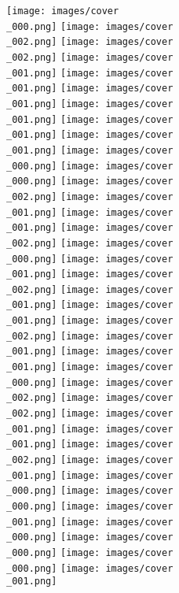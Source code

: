 \documentclass{article}%
\begin{document}
\begin{minipage}{\textwidth}
\texttt{[image: images/cover\\\_000.png]}%
\texttt{[image: images/cover\\\_002.png]}%
\texttt{[image: images/cover\\\_002.png]}%
\texttt{[image: images/cover\\\_001.png]}%
\texttt{[image: images/cover\\\_001.png]}%
\newline%
\hspace*{-1.1663792519475682cm}%
\vspace*{-0.2cm}%
\texttt{[image: images/cover\\\_001.png]}%
\texttt{[image: images/cover\\\_001.png]}%
\texttt{[image: images/cover\\\_001.png]}%
\texttt{[image: images/cover\\\_001.png]}%
\texttt{[image: images/cover\\\_000.png]}%
\texttt{[image: images/cover\\\_000.png]}%
\texttt{[image: images/cover\\\_002.png]}%
\texttt{[image: images/cover\\\_001.png]}%
\texttt{[image: images/cover\\\_001.png]}%
\newline%
\hspace*{-2.4164272347234794cm}%
\vspace*{-0.2cm}%
\texttt{[image: images/cover\\\_002.png]}%
\texttt{[image: images/cover\\\_000.png]}%
\texttt{[image: images/cover\\\_001.png]}%
\texttt{[image: images/cover\\\_002.png]}%
\texttt{[image: images/cover\\\_001.png]}%
\texttt{[image: images/cover\\\_001.png]}%
\texttt{[image: images/cover\\\_002.png]}%
\texttt{[image: images/cover\\\_001.png]}%
\texttt{[image: images/cover\\\_001.png]}%
\newline%
\hspace*{-1.224628727880675cm}%
\vspace*{-0.2cm}%
\texttt{[image: images/cover\\\_000.png]}%
\texttt{[image: images/cover\\\_002.png]}%
\texttt{[image: images/cover\\\_002.png]}%
\texttt{[image: images/cover\\\_001.png]}%
\texttt{[image: images/cover\\\_001.png]}%
\texttt{[image: images/cover\\\_002.png]}%
\texttt{[image: images/cover\\\_001.png]}%
\texttt{[image: images/cover\\\_000.png]}%
\texttt{[image: images/cover\\\_000.png]}%
\newline%
\hspace*{-1.4582735831172853cm}%
\vspace*{-0.2cm}%
\texttt{[image: images/cover\\\_001.png]}%
\texttt{[image: images/cover\\\_000.png]}%
\texttt{[image: images/cover\\\_000.png]}%
\texttt{[image: images/cover\\\_000.png]}%
\texttt{[image: images/cover\\\_001.png]}%

\end{minipage}
\end{document}
